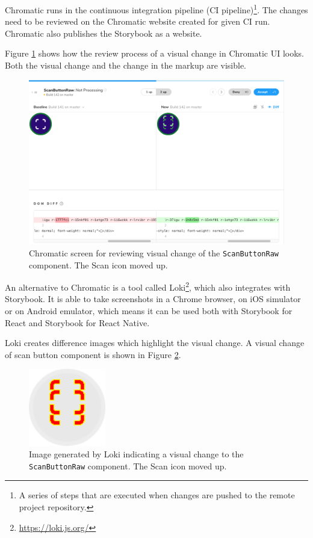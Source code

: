 \documentclass[
  digital, %
  table,   %
  oneside, %
  lof,     %
  lot,     %
]{fithesis3}
\begin{document}
Chromatic runs in the continuous integration pipeline (CI pipeline)\footnote{A series of steps that are executed when changes are pushed to the remote project repository.}. The changes need to be reviewed on the Chromatic website created for given CI run. Chromatic also publishes the Storybook as a website.

Figure \ref{fig:chromatic_diff} shows how the review process of a visual change in Chromatic UI looks. Both the visual change and the change in the markup are visible.

\begin{figure}
    \begin{center}
        \includegraphics[width=\textwidth]{figures/other/chromatic_diff}
    \end{center}
    \caption{Chromatic screen for reviewing visual change of the \texttt{ScanButtonRaw} component. The Scan icon moved up.}
    \label{fig:chromatic_diff}
\end{figure}

An alternative to Chromatic is a tool called Loki\footnote{\url{https://loki.js.org/}}, which also integrates with Storybook. It is able to take screenshots in a Chrome browser, on iOS simulator or on Android emulator, which means it can be used both with Storybook for React and Storybook for React Native.

Loki creates difference images which highlight the visual change. A visual change of scan button component is shown in Figure \ref{fig:loki_diff}.

\begin{figure}
    \begin{center}
        \includegraphics[width=0.3\textwidth]{figures/other/loki_diff}
    \end{center}
    \caption{Image generated by Loki indicating a visual change to the \texttt{ScanButtonRaw} component. The Scan icon moved up.}
    \label{fig:loki_diff}
\end{figure}
\end{document}

